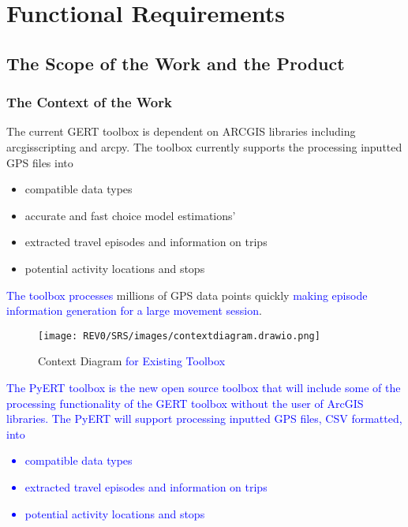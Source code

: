 \documentclass[12pt, titlepage]{article}
\begin{document}
\newpage
\section{Functional Requirements}

\subsection{The Scope of the Work and the Product}

\subsubsection{The Context of the Work}
The current GERT toolbox is dependent on ARCGIS libraries including arcgisscripting and arcpy. The toolbox currently supports the processing inputted GPS files into
\begin{itemize}
    \item compatible data types
    \item accurate and fast choice model estimations'
    \item extracted travel episodes and information on trips
    \item potential activity locations and stops
\end{itemize}
\textcolor{blue}{The toolbox processes} millions of GPS data points quickly \textcolor{blue}{making episode information generation for a large movement session}.

\begin{figure}[!h]
	    \begin{center}
    	    \texttt{[image: REV0/SRS/images/contextdiagram.drawio.png]}
    	    \caption{Context Diagram \textcolor{blue}{for Existing Toolbox}}
    	    \label{fig: Context Diagram}
    	\end{center}
\end{figure}

\textcolor{blue}{The PyERT toolbox is the new open source toolbox that will include some of the processing functionality of the GERT toolbox without the user of ArcGIS libraries. The PyERT will support processing inputted GPS files, CSV formatted, into
\begin{itemize}
    \item compatible data types
    \item extracted travel episodes and information on trips
    \item potential activity locations and stops
\end{itemize}}
\end{document}
